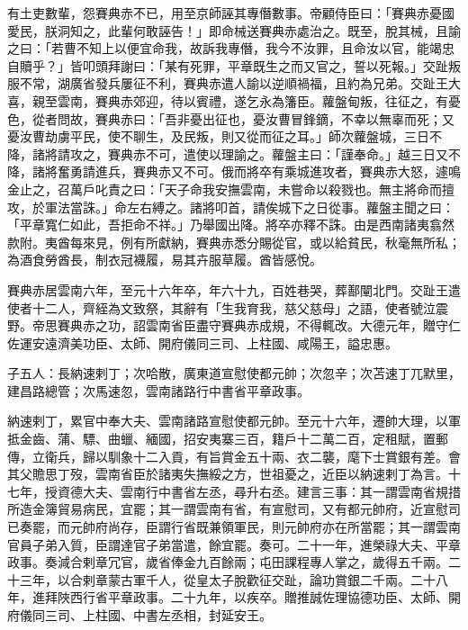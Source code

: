\begin{pinyinscope}
 有土吏數輩，怨賽典赤不已，用至京師誣其專僭數事。帝顧侍臣曰：「賽典赤憂國愛民，朕洞知之，此輩何敢誣告！」即命械送賽典赤處治之。既至，脫其械，且諭之曰：「若曹不知上以便宜命我，故訴我專僭，我今不汝罪，且命汝以官，能竭忠自贖乎？」皆叩頭拜謝曰：「某有死罪，平章既生之而又官之，誓以死報。」交趾叛服不常，湖廣省發兵屢征不利，賽典赤遣人諭以逆順禍福，且約為兄弟。交趾王大喜，親至雲南，賽典赤郊迎，待以賓禮，遂乞永為籓臣。蘿盤甸叛，往征之，有憂色，從者問故，賽典赤曰：「吾非憂出征也，憂汝曹冒鋒鏑，不幸以無辜而死；又憂汝曹劫虜平民，使不聊生，及民叛，則又從而征之耳。」師次蘿盤城，三日不降，諸將請攻之，賽典赤不可，遣使以理諭之。蘿盤主曰：「謹奉命。」越三日又不降，諸將奮勇請進兵，賽典赤又不可。俄而將卒有乘城進攻者，賽典赤大怒，遽鳴金止之，召萬戶叱責之曰：「天子命我安撫雲南，未嘗命以殺戮也。無主將命而擅攻，於軍法當誅。」命左右縛之。諸將叩首，請俟城下之日從事。蘿盤主聞之曰：「平章寬仁如此，吾拒命不祥。」乃舉國出降。將卒亦釋不誅。由是西南諸夷翕然款附。夷酋每來見，例有所獻納，賽典赤悉分賜從官，或以給貧民，秋毫無所私；為酒食勞酋長，制衣冠襪履，易其卉服草履。酋皆感悅。



 賽典赤居雲南六年，至元十六年卒，年六十九，百姓巷哭，葬鄯闡北門。交趾王遣使者十二人，齊絰為文致祭，其辭有「生我育我，慈父慈母」之語，使者號泣震野。帝思賽典赤之功，詔雲南省臣盡守賽典赤成規，不得輒改。大德元年，贈守仁佐運安遠濟美功臣、太師、開府儀同三司、上柱國、咸陽王，謚忠惠。



 子五人：長納速剌丁；次哈散，廣東道宣慰使都元帥；次忽辛；次苫速丁兀默里，建昌路總管；次馬速忽，雲南諸路行中書省平章政事。



 納速剌丁，累官中奉大夫、雲南諸路宣慰使都元帥。至元十六年，遷帥大理，以軍抵金齒、蒲、驃、曲蠟、緬國，招安夷寨三百，籍戶十二萬二百，定租賦，置郵傳，立衛兵，歸以馴象十二入貢，有旨賞金五十兩、衣二襲，麾下士賞銀有差。會其父贍思丁歿，雲南省臣於諸夷失撫綏之方，世祖憂之，近臣以納速剌丁為言。十七年，授資德大夫、雲南行中書省左丞，尋升右丞。建言三事：其一謂雲南省規措所造金簿貿易病民，宜罷；其一謂雲南有省，有宣慰司，又有都元帥府，近宣慰司已奏罷，而元帥府尚存，臣謂行省既兼領軍民，則元帥府亦在所當罷；其一謂雲南官員子弟入質，臣謂達官子弟當遣，餘宜罷。奏可。二十一年，進榮祿大夫、平章政事。奏減合剌章冗官，歲省俸金九百餘兩；屯田課程專人掌之，歲得五千兩。二十三年，以合剌章蒙古軍千人，從皇太子脫歡征交趾，論功賞銀二千兩。二十八年，進拜陜西行省平章政事。二十九年，以疾卒。贈推誠佐理協德功臣、太師、開府儀同三司、上柱國、中書左丞相，封延安王。




\end{pinyinscope}
